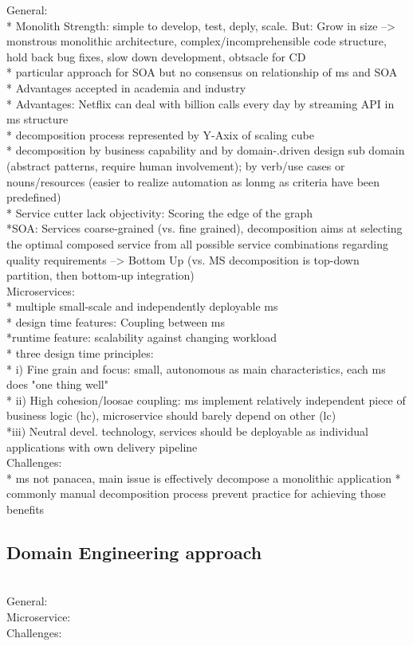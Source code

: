 General: \\
* Monolith Strength: simple to develop, test, deply, scale. But: Grow in size --> monstrous monolithic architecture, complex/incomprehensible code structure, hold back bug fixes, slow down development, obtsacle for CD\\
* particular approach for SOA but no consensus on relationship of ms and SOA \\
* Advantages  accepted in academia and industry\\
* Advantages: Netflix can deal with billion calls every day by streaming API in ms structure\\
* decomposition process represented by Y-Axix of scaling cube\\
* decomposition by business capability and by domain-.driven design sub domain (abstract patterns, require human involvement); by verb/use cases or nouns/resources (easier to realize automation as lonmg as criteria have been predefined)\\
* Service cutter lack objectivity: Scoring the edge of the graph\\
*SOA: Services coarse-grained (vs. fine grained), decomposition aims at selecting the optimal composed service from all possible service combinations regarding quality requirements --> Bottom Up (vs. MS decomposition is top-down partition, then bottom-up integration)\\

Microservices: \\
* multiple small-scale and independently deployable ms\\
* design time features: Coupling between ms \\
*runtime feature: scalability against changing workload\\
* three design time principles:\\
* i) Fine grain and focus: small, autonomous as main characteristics, each ms does "one thing well"\\
* ii) High cohesion/loosae coupling: ms implement relatively independent piece of business logic (hc), microservice should barely depend on other (lc) \\
*iii) Neutral devel. technology, services should be deployable as individual applications with own delivery pipeline \\


Challenges:\\
* ms not panacea, main issue is effectively decompose a monolithic application
* commonly manual decomposition process prevent practice for achieving those benefits



\subsection{Domain Engineering approach}
\cite{DomainEngineeringMunezero} \\

General:\\


Microservice:\\




Challenges: \\






